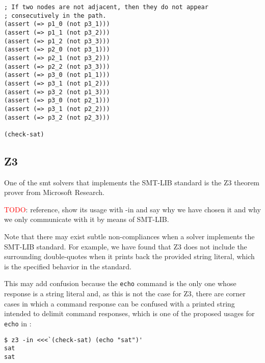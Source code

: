 \begin{verbatim}
; If two nodes are not adjacent, then they do not appear
; consecutively in the path.
(assert (=> p1_0 (not p3_1)))
(assert (=> p1_1 (not p3_2)))
(assert (=> p1_2 (not p3_3)))
(assert (=> p2_0 (not p3_1)))
(assert (=> p2_1 (not p3_2)))
(assert (=> p2_2 (not p3_3)))
(assert (=> p3_0 (not p1_1)))
(assert (=> p3_1 (not p1_2)))
(assert (=> p3_2 (not p1_3)))
(assert (=> p3_0 (not p2_1)))
(assert (=> p3_1 (not p2_2)))
(assert (=> p3_2 (not p2_3)))

(check-sat)
\end{verbatim}

\subsection{Z3}

One of the \acrshort{smt} solvers that implements the SMT-LIB standard is the
Z3 theorem prover from Microsoft Research.

\textcolor{red}{TODO}: reference, show its usage with -in and say why we have
chosen it and why we only communicate with it by means of SMT-LIB.

Note that there may exist subtle non-compliances when a solver implements the
SMT-LIB standard. For example, we have found that Z3 does not include the
surrounding double-quotes when it prints back the provided string literal,
which is the specified behavior in the standard.

This may add confusion because the \verb|echo| command is the only one whose
response is a string literal and, as this is not the case for Z3, there are 
corner cases in which a command response can be confused with a printed string
intended to delimit command responses, which is one of the proposed usages for
\verb|echo| in \cite{smtLibStandard}:

\begin{verbatim}
$ z3 -in <<<`(check-sat) (echo "sat")'
sat
sat
\end{verbatim}
